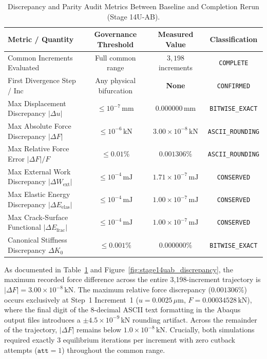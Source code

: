 \begin{table}[htbp]
  \centering
  \small
  \caption{Discrepancy and Parity Audit Metrics Between Baseline and Completion Rerun (Stage 14U-AB).}
  \label{tab:stage14uab_parity_metrics}
  \begin{tabular}{lccc}
    \hline
    \textbf{Metric / Quantity} & \textbf{Governance Threshold} & \textbf{Measured Value} & \textbf{Classification} \\
    \hline
    Common Increments Evaluated & Full common range & $3{,}198$ increments & \texttt{COMPLETE} \\
    First Divergence Step / Inc & Any physical bifurcation & \textbf{None} & \texttt{CONFIRMED} \\
    Max Displacement Discrepancy $|\Delta u|$ & $\le 10^{-7}\,\mathrm{mm}$ & $0.000000\,\mathrm{mm}$ & \texttt{BITWISE\_EXACT} \\
    Max Absolute Force Discrepancy $|\Delta F|$ & $\le 10^{-6}\,\mathrm{kN}$ & $3.00 \times 10^{-8}\,\mathrm{kN}$ & \texttt{ASCII\_ROUNDING} \\
    Max Relative Force Error $|\Delta F|/F$ & $\le 0.01\%$ & $0.001306\%$ & \texttt{ASCII\_ROUNDING} \\
    Max External Work Discrepancy $|\Delta W_{\mathrm{ext}}|$ & $\le 10^{-4}\,\mathrm{mJ}$ & $1.71 \times 10^{-7}\,\mathrm{mJ}$ & \texttt{CONSERVED} \\
    Max Elastic Energy Discrepancy $|\Delta E_{\mathrm{elas}}|$ & $\le 10^{-4}\,\mathrm{mJ}$ & $1.00 \times 10^{-7}\,\mathrm{mJ}$ & \texttt{CONSERVED} \\
    Max Crack-Surface Functional $|\Delta E_{\mathrm{frac}}|$ & $\le 10^{-4}\,\mathrm{mJ}$ & $1.00 \times 10^{-7}\,\mathrm{mJ}$ & \texttt{CONSERVED} \\
    Canonical Stiffness Discrepancy $\Delta K_0$ & $\le 0.001\%$ & $0.000000\%$ & \texttt{BITWISE\_EXACT} \\
    \hline
  \end{tabular}
\end{table}

As documented in Table~\ref{tab:stage14uab_parity_metrics} and Figure~\ref{fig:stage14uab_discrepancy}, the maximum recorded force difference across the entire 3,198-increment trajectory is $|\Delta F| = 3.00 \times 10^{-8}\,\mathrm{kN}$. The maximum relative force discrepancy ($0.001306\%$) occurs exclusively at Step~1 Increment~1 ($u = 0.0025\,\mu\mathrm{m}$, $F = 0.00034528\,\mathrm{kN}$), where the final digit of the 8-decimal ASCII text formatting in the Abaqus output files introduces a $\pm 4.5 \times 10^{-9}\,\mathrm{kN}$ rounding artifact. Across the remainder of the trajectory, $|\Delta F|$ remains below $1.0 \times 10^{-8}\,\mathrm{kN}$. Crucially, both simulations required exactly 3 equilibrium iterations per increment with zero cutback attempts ($\mathtt{att} = 1$) throughout the common range.

